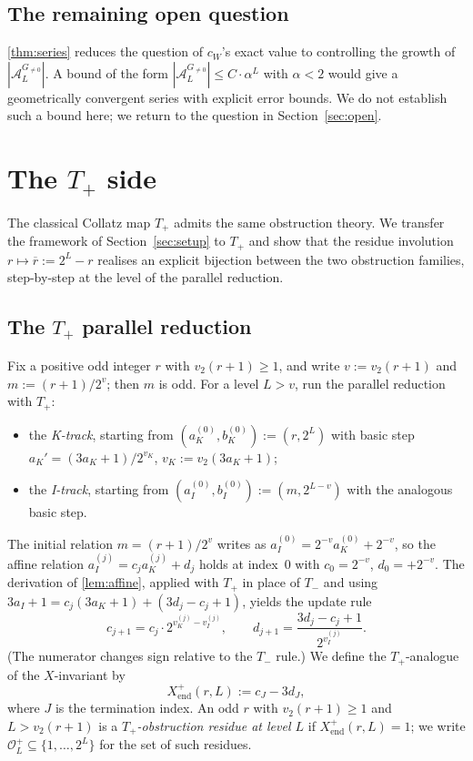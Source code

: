 \documentclass[11pt,reqno]{amsart}
\newcommand{\Tplus}{T_{+}}
\newcommand{\Tminus}{T_{-}}
\newcommand{\Obs}{\mathcal{O}}
\newcommand{\Atom}{\mathcal{A}}
\newcommand{\Xend}{X_{\mathrm{end}}}
\newcommand{\vk}{v_{K}}
\newcommand{\vi}{v_{I}}
\newcommand{\vtwo}{v_{2}}
\begin{document}
\subsection{The remaining open question}

\cref{thm:series} reduces the question of $c_W$'s exact value to
controlling the growth of $|\Atom_L^{G_{\ne 0}}|$. A bound of the form
$|\Atom_L^{G_{\ne 0}}| \le C \cdot \alpha^L$ with $\alpha < 2$ would give a
geometrically convergent series with explicit error bounds. We do not
establish such a bound here; we return to the question in
Section~\ref{sec:open}.

\section{The \texorpdfstring{$T_+$}{T+} side}
\label{sec:tplus}

The classical Collatz map $\Tplus$ admits the same obstruction theory.
We transfer the framework of Section~\ref{sec:setup} to $\Tplus$ and
show that the residue involution $r \mapsto \overline{r} := 2^L - r$
realises an explicit bijection between the two obstruction families,
step-by-step at the level of the parallel reduction.

\subsection{The \texorpdfstring{$\Tplus$}{T+} parallel reduction}

Fix a positive odd integer $r$ with $\vtwo(r+1) \ge 1$, and write
$v := \vtwo(r+1)$ and $m := (r+1)/2^v$; then $m$ is odd. For a level
$L > v$, run the parallel reduction with $\Tplus$:
\begin{itemize}
\item the \emph{K-track}, starting from $(a_K^{(0)}, b_K^{(0)}) := (r, 2^L)$
  with basic step $a_K' = (3 a_K + 1)/2^{\vk}$,
  $\vk := \vtwo(3 a_K + 1)$;
\item the \emph{I-track}, starting from
  $(a_I^{(0)}, b_I^{(0)}) := (m, 2^{L - v})$ with the analogous basic step.
\end{itemize}
The initial relation $m = (r+1)/2^v$ writes as
$a_I^{(0)} = 2^{-v} a_K^{(0)} + 2^{-v}$, so the affine relation
$a_I^{(j)} = c_j a_K^{(j)} + d_j$ holds at index~$0$ with
$c_0 = 2^{-v}$, $d_0 = +2^{-v}$. The derivation of
\cref{lem:affine}, applied with $\Tplus$ in place of $\Tminus$ and
using $3 a_I + 1 = c_j (3 a_K + 1) + (3 d_j - c_j + 1)$, yields the
update rule
\[
c_{j+1} = c_j \cdot 2^{\vk^{(j)} - \vi^{(j)}}, \qquad
d_{j+1} = \frac{3 d_j - c_j + 1}{2^{\vi^{(j)}}}.
\]
(The numerator changes sign relative to the $\Tminus$ rule.) We define
the $\Tplus$-analogue of the $X$-invariant by
\[
\Xend^{+}(r, L) := c_J - 3 d_J,
\]
where $J$ is the termination index. An odd $r$ with $\vtwo(r+1) \ge 1$
and $L > \vtwo(r+1)$ is a \emph{$\Tplus$-obstruction residue at level $L$}
if $\Xend^{+}(r, L) = 1$; we write $\Obs_L^{+} \subseteq \{1, \ldots, 2^L\}$
for the set of such residues.
\end{document}
